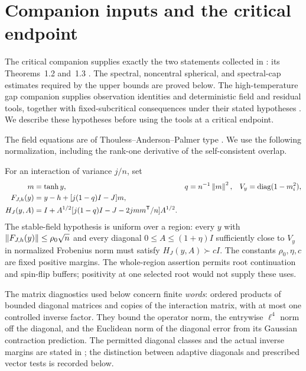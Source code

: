 \section{Companion inputs and the critical endpoint}\label{sec:accepted-inputs}

The critical companion supplies exactly the two statements collected
in : its Theorems~1.2 and~1.3
\cite{AcceptedCritical}. The spectral, noncentral spherical, and
spectral-cap estimates required by the upper bounds are proved below.
The high-temperature gap companion supplies observation identities
and deterministic field and residual tools, together with fixed-subcritical
consequences under their stated hypotheses \cite{AcceptedGap}.
We describe these hypotheses before using the tools at a critical
endpoint.

The field equations are of Thouless--Anderson--Palmer type
\cite{TAP1977}. We use the following normalization, including the
rank-one derivative of the self-consistent overlap.

For an interaction of variance $j/n$, set
\begin{align*}
 m&=\tanh y,&q&=n^{-1}\left\lVert m\right\rVert^2,&V_y&=\operatorname{diag}(1-m_i^2),\\
 F_{J,h}(y)&=y-h+[j(1-q)I-J]m,&&&\\
 H_J(y,A)&=I+A^{1/2}
       [j(1-q)I-J-2jmm^{\mathsf T}/n]A^{1/2}.&&&
\end{align*}
The stable-field hypothesis is uniform over a region: every
$y$ with $\left\lVert F_{J,h}(y)\right\rVert\le\rho_0\sqrt n$ and every diagonal
$0\le A\le(1+\eta)I$ sufficiently close to $V_y$ in normalized
Frobenius norm must satisfy $H_J(y,A)\succ cI$.
The constants $\rho_0,\eta,c$ are fixed positive margins.
The whole-region assertion permits root continuation and spin-flip
buffers; positivity at one selected root would not supply these uses.

The matrix diagnostics used below concern finite \emph{words}: ordered
products of bounded diagonal matrices and copies of the interaction
matrix, with at most one controlled inverse factor. They bound the
operator norm, the entrywise $\ell^4$ norm off the diagonal, and the
Euclidean norm of the diagonal error from its Gaussian contraction
prediction. The permitted diagonal classes and the actual inverse
margins are stated in ;
the distinction between adaptive diagonals and prescribed vector tests
is recorded below.

